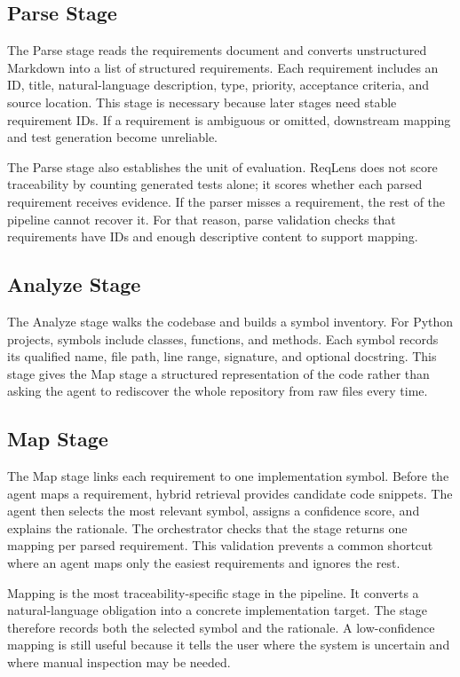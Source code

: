 \documentclass[conference]{IEEEtran}
\begin{document}
\subsection{Parse Stage}
The Parse stage reads the requirements document and converts unstructured
Markdown into a list of structured requirements. Each requirement includes an
ID, title, natural-language description, type, priority, acceptance criteria,
and source location. This stage is necessary because later stages need stable
requirement IDs. If a requirement is ambiguous or omitted, downstream mapping
and test generation become unreliable.

The Parse stage also establishes the unit of evaluation. ReqLens does not score
traceability by counting generated tests alone; it scores whether each parsed
requirement receives evidence. If the parser misses a requirement, the rest of
the pipeline cannot recover it. For that reason, parse validation checks that
requirements have IDs and enough descriptive content to support mapping.

\subsection{Analyze Stage}
The Analyze stage walks the codebase and builds a symbol inventory. For Python
projects, symbols include classes, functions, and methods. Each symbol records
its qualified name, file path, line range, signature, and optional docstring.
This stage gives the Map stage a structured representation of the code rather
than asking the agent to rediscover the whole repository from raw files every
time.

\subsection{Map Stage}
The Map stage links each requirement to one implementation symbol. Before the
agent maps a requirement, hybrid retrieval provides candidate code snippets.
The agent then selects the most relevant symbol, assigns a confidence score,
and explains the rationale. The orchestrator checks that the stage returns one
mapping per parsed requirement. This validation prevents a common shortcut
where an agent maps only the easiest requirements and ignores the rest.

Mapping is the most traceability-specific stage in the pipeline. It converts a
natural-language obligation into a concrete implementation target. The stage
therefore records both the selected symbol and the rationale. A low-confidence
mapping is still useful because it tells the user where the system is uncertain
and where manual inspection may be needed.
\end{document}
